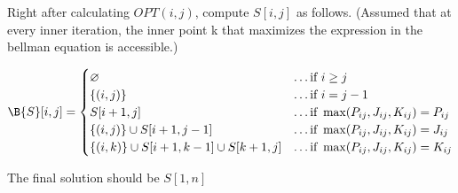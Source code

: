 Right after calculating $OPT(i,j)$, compute $S[i,j]$ as follows. (Assumed that at every inner iteration, the inner point k that maximizes the expression in the bellman equation is accessible.)

\begin{equation}
    \begin{split}
        \B{S}[i, j] = \begin{cases}
                        \varnothing & \dots \text{if } i \geq j\\
                        \{(i,j)\} & \dots \text{if } i = j - 1\\
                        S[i+1,j] & \dots \text{if } \max (P_{ij}, J_{ij}, K_{ij}) = P_{ij} \\
                        \{(i,j)\} \cup S[i+1, j-1] & \dots \text{if } \max (P_{ij}, J_{ij}, K_{ij}) = J_{ij} \\
                        \{(i,k)\} \cup S[i+1, k-1] \cup S[k+1, j] & \dots \text{if } \max (P_{ij}, J_{ij}, K_{ij}) = K_{ij}
                    \end{cases}
    \end{split}
\end{equation}


The final solution should be $S[1, n]$